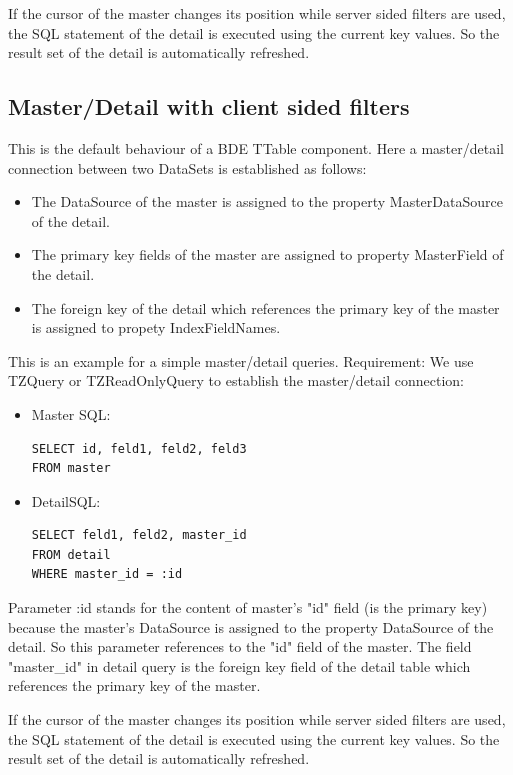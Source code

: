 \documentclass[a4paper,12pt,oneside]{book}
\begin{document}
If the cursor of the master changes its position while server sided filters are used, the SQL statement of the detail is executed using the current key values.
So the result set of the detail is automatically refreshed.

\subsection{Master/Detail with client sided filters}
This is the default behaviour of a BDE TTable component.
Here a master/detail connection between two DataSets is established as follows:

\begin{itemize}
  \item The DataSource of the master is assigned to the property MasterDataSource of the detail.
	\item The primary key fields of the master are assigned to property MasterField of the detail.
	\item The foreign key of the detail which references the primary key of the master is assigned to propety IndexFieldNames.
\end{itemize}

This is an example for a simple master/detail queries.
Requirement: We use TZQuery or TZReadOnlyQuery to establish the master/detail connection:

\begin{itemize}
  \item Master SQL:
	  \begin{verbatim}
SELECT id, feld1, feld2, feld3
FROM master
    \end{verbatim}
  \item DetailSQL:
	  \begin{verbatim}
SELECT feld1, feld2, master_id
FROM detail
WHERE master_id = :id
    \end{verbatim}
\end{itemize}

Parameter :id stands for the content of master's "id" field (is the primary key) because the master's DataSource is assigned to the property DataSource of the detail.
So this parameter references to the "id" field of the master.
The field "master\_id" in detail query is the foreign key field of the detail table which references the primary key of the master.

If the cursor of the master changes its position while server sided filters are used, the SQL statement of the detail is executed using the current key values.
So the result set of the detail is automatically refreshed.
\end{document}
